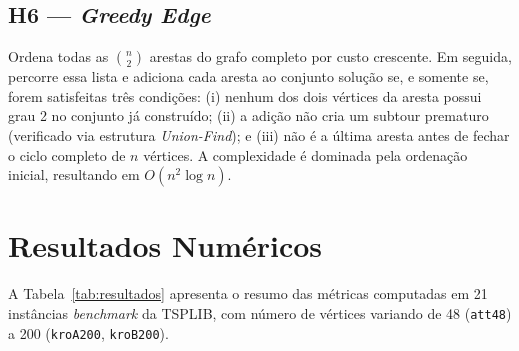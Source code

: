 \documentclass[12pt, a4paper]{article}
\begin{document}
\subsection{H6 --- \textit{Greedy Edge} \cite{bentley1992}}

Ordena todas as $\binom{n}{2}$ arestas do grafo completo por custo crescente. Em seguida,
percorre essa lista e adiciona cada aresta ao conjunto solução se, e somente se, forem
satisfeitas três condições: (i) nenhum dos dois vértices da aresta possui grau 2 no
conjunto já construído; (ii) a adição não cria um subtour prematuro (verificado via
estrutura \textit{Union-Find}); e (iii) não é a última aresta antes de fechar o ciclo
completo de $n$ vértices. A complexidade é dominada pela ordenação inicial,
resultando em $O(n^2 \log n)$.

\section{Resultados Numéricos}

A Tabela~\ref{tab:resultados} apresenta o resumo das métricas computadas em 21 instâncias
\textit{benchmark} da TSPLIB, com número de vértices variando de 48 (\texttt{att48}) a
200 (\texttt{kroA200}, \texttt{kroB200}).

\begin{table}[H]
    \centering
    \caption{Resumo de desempenho das 6 heurísticas em 21 instâncias.}
    \label{tab:resultados}
\end{table}
\end{document}
